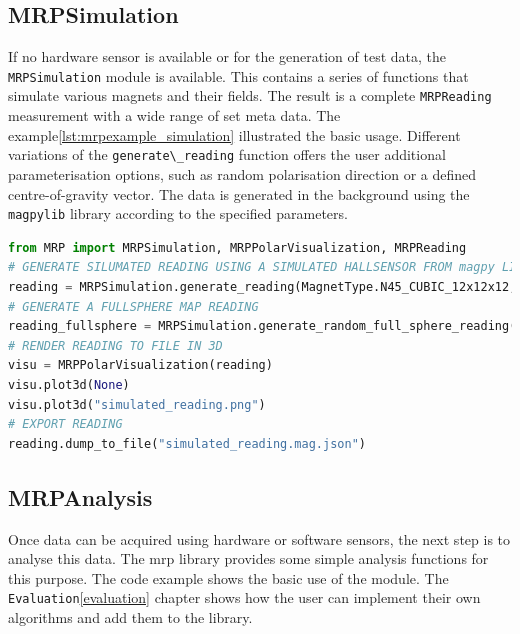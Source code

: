 \hypertarget{mrpsimulation}{%
\subsection{MRPSimulation}\label{mrpsimulation}}

If no hardware sensor is available or for the generation of test data,
the \passthrough{\lstinline!MRPSimulation!} module is available. This
contains a series of functions that simulate various magnets and their
fields. The result is a complete \passthrough{\lstinline!MRPReading!}
measurement with a wide range of set meta data. The
example\ref{lst:mrpexample_simulation} illustrated the basic usage.
Different variations of the \passthrough{\lstinline!generate\_reading!}
function offers the user additional parameterisation options, such as
random polarisation direction or a defined centre-of-gravity vector. The
data is generated in the background using the
\passthrough{\lstinline!magpylib!}\cite{ortner2020magpylib} library
according to the specified parameters.

\begin{lstlisting}[language=Python, caption={MRPSimulation example illustrates the usage of several data analysis functions}, label=lst:mrpexample_simulation]
from MRP import MRPSimulation, MRPPolarVisualization, MRPReading
# GENERATE SILUMATED READING USING A SIMULATED HALLSENSOR FROM magpy LIBRARY
reading = MRPSimulation.generate_reading(MagnetType.N45_CUBIC_12x12x12,_add_random_polarisation=True)
# GENERATE A FULLSPHERE MAP READING
reading_fullsphere = MRPSimulation.generate_random_full_sphere_reading()
# RENDER READING TO FILE IN 3D
visu = MRPPolarVisualization(reading)
visu.plot3d(None)
visu.plot3d("simulated_reading.png")
# EXPORT READING
reading.dump_to_file("simulated_reading.mag.json")
\end{lstlisting}

\hypertarget{mrpanalysis}{%
\subsection{MRPAnalysis}\label{mrpanalysis}}

Once data can be acquired using hardware or software sensors, the next
step is to analyse this data. The \gls{mrp} library provides some simple
analysis functions for this purpose. The code example shows the basic
use of the module. The
\passthrough{\lstinline!Evaluation!}\ref{evaluation} chapter shows how
the user can implement their own algorithms and add them to the library.

